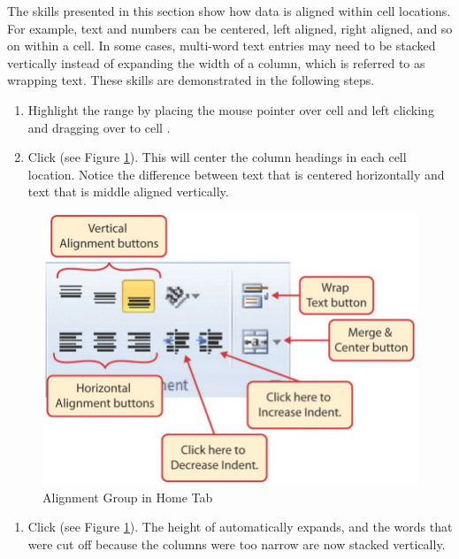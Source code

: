The skills presented in this section show how data is aligned within cell locations. For example, text and numbers can be centered, left aligned, right aligned, and so on within a cell. In some cases, multi-word text entries may need to be stacked vertically instead of expanding the width of a column, which is referred to as wrapping text. These skills are demonstrated in the following steps.

\begin{enumerate}
	\item Highlight the range  by placing the mouse pointer over cell  and left clicking and dragging over to cell .
	\item Click  (see Figure \ref{01:fig38}). This will center the column headings in each cell location. Notice the difference between text that is centered horizontally and text that is middle aligned vertically.
\end{enumerate}

\begin{figure}[H]
	\centering
	\includegraphics[width=\maxwidth{.95\linewidth}]{gfx/ch01_fig38}
	\caption{Alignment Group in Home Tab}
	\label{01:fig38}
\end{figure}

\begin{enumerate}[resume]
	\item Click  (see Figure \ref{01:fig38}). The height of  automatically expands, and the words that were cut off because the columns were too narrow are now stacked vertically.
\end{enumerate}

